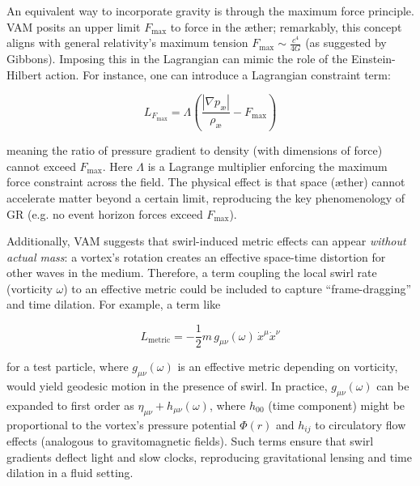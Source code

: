 \documentclass[a4paper,12pt]{article}
\begin{document}
        
        An equivalent way to incorporate gravity is through the maximum force principle. VAM posits an upper limit $F_{\max}$ to force in the æther; remarkably, this concept aligns with general relativity’s maximum tension $F_{\max} \sim \frac{c^4}{4G}$ (as suggested by Gibbons). Imposing this in the Lagrangian can mimic the role of the Einstein-Hilbert action. For instance, one can introduce a Lagrangian constraint term:
        
        \begin{equation}
            L_{F_{\max}} = \Lambda\left(\frac{|\nabla p_{\text{\ae}}|}{\rho_{\text{\ae}}} - F_{\max}\right)
            \label{eq:max-force-constraint}
        \end{equation}
        
        meaning the ratio of pressure gradient to density (with dimensions of force) cannot exceed $F_{\max}$. Here $\Lambda$ is a Lagrange multiplier enforcing the maximum force constraint across the field. The physical effect is that space (æther) cannot accelerate matter beyond a certain limit, reproducing the key phenomenology of GR (e.g. no event horizon forces exceed $F_{\max}$).
        
        
        Additionally, VAM suggests that swirl-induced metric effects can appear \textit{without actual mass}: a vortex’s rotation creates an effective space-time distortion for other waves in the medium. Therefore, a term coupling the local swirl rate (vorticity $\omega$) to an effective metric could be included to capture “frame-dragging” and time dilation. For example, a term like
        
        \begin{equation}
            L_{\text{metric}} = -\frac{1}{2}m\, g_{\mu\nu}(\omega) \, \dot{x}^\mu \dot{x}^\nu
            \label{eq:metric-vorticity}
        \end{equation}
        
        for a test particle, where $g_{\mu\nu}(\omega)$ is an effective metric depending on vorticity, would yield geodesic motion in the presence of swirl. In practice, $g_{\mu\nu}(\omega)$ can be expanded to first order as $\eta_{\mu\nu} + h_{\mu\nu}(\omega)$, where $h_{00}$ (time component) might be proportional to the vortex’s pressure potential $\Phi(r)$ and $h_{ij}$ to circulatory flow effects (analogous to gravitomagnetic fields). Such terms ensure that swirl gradients deflect light and slow clocks, reproducing gravitational lensing and time dilation in a fluid setting.
        
\end{document}
